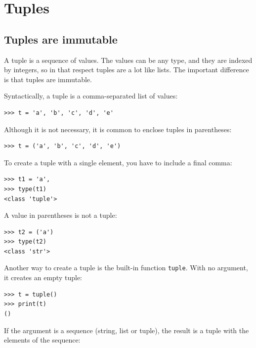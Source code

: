 \documentclass[10pt]{book}
\begin{document}
\chapter{Tuples}
\label{tuplechap}

\section{Tuples are immutable}


A tuple is a sequence of values.  The values can be any type, and
they are indexed by integers, so in that respect tuples are a lot
like lists.  The important difference is that tuples are immutable.


Syntactically, a tuple is a comma-separated list of values:

\beforeverb
\begin{verbatim}
>>> t = 'a', 'b', 'c', 'd', 'e'
\end{verbatim}
\afterverb
%
Although it is not necessary, it is common to enclose tuples in
parentheses:


\beforeverb
\begin{verbatim}
>>> t = ('a', 'b', 'c', 'd', 'e')
\end{verbatim}
\afterverb
%
To create a tuple with a single element, you have to include a final
comma:


\beforeverb
\begin{verbatim}
>>> t1 = 'a',
>>> type(t1)
<class 'tuple'>
\end{verbatim}
\afterverb
%
A value in parentheses is not a tuple:

\beforeverb
\begin{verbatim}
>>> t2 = ('a')
>>> type(t2)
<class 'str'>
\end{verbatim}
\afterverb
%
Another way to create a tuple is the built-in function {\tt tuple}.
With no argument, it creates an empty tuple:


\beforeverb
\begin{verbatim}
>>> t = tuple()
>>> print(t)
()
\end{verbatim}
\afterverb
%
If the argument is a sequence (string, list or tuple), the result
is a tuple with the elements of the sequence:
\end{document}
